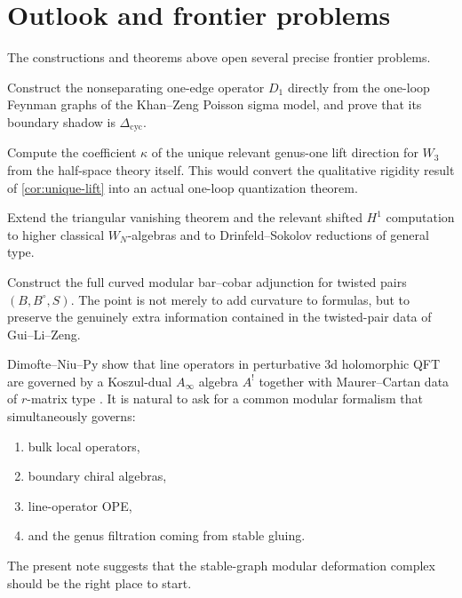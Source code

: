 \section{Outlook and frontier problems}

The constructions and theorems above open several precise frontier problems.

\begin{question}
Construct the nonseparating one-edge operator $D_1$ directly from the one-loop Feynman
graphs of the Khan--Zeng Poisson sigma model, and prove that its boundary shadow is
$\Delta_{\mathrm{cyc}}$.
\end{question}

\begin{question}
Compute the coefficient $\kappa$ of the unique relevant genus-one lift direction for
$W_3$ from the half-space theory itself. This would convert the qualitative rigidity
result of \cref{cor:unique-lift} into an actual one-loop quantization theorem.
\end{question}

\begin{question}[Beyond $W_3$]
Extend the triangular vanishing theorem and the relevant shifted $H^1$ computation to
higher classical $W_N$-algebras and to Drinfeld--Sokolov reductions of general type.
\end{question}

\begin{question}
Construct the full curved modular bar--cobar adjunction for twisted pairs $(B,B^\circ,S)$.
The point is not merely to add curvature to formulas, but to preserve the genuinely
extra information contained in the twisted-pair data of Gui--Li--Zeng.
\end{question}

\begin{question}
Dimofte--Niu--Py show that line operators in perturbative 3d holomorphic QFT are governed
by a Koszul-dual $A_\infty$ algebra $A^!$ together with Maurer--Cartan data of $r$-matrix
type \cite{DNP25}. It is natural to ask for a common modular formalism that
simultaneously governs:
\begin{enumerate}[leftmargin=2.4em]
\item bulk local operators,
\item boundary chiral algebras,
\item line-operator OPE,
\item and the genus filtration coming from stable gluing.
\end{enumerate}
The present note suggests that the stable-graph modular deformation complex should be the
right place to start.
\end{question}

